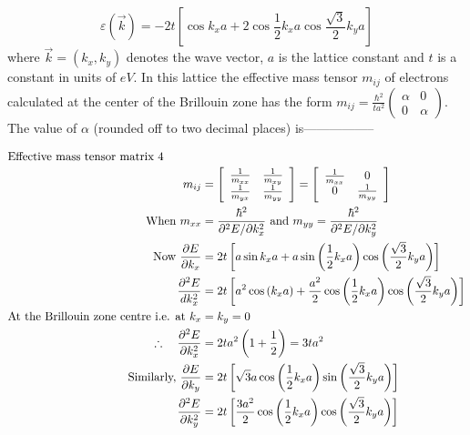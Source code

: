 \begin{enumerate}
	$$
	\varepsilon(\vec{k})=-2 t\left[\cos k_{x} a+2 \cos \frac{1}{2} k_{x} a \cos \frac{\sqrt{3}}{2} k_{y} a\right]
	$$
	where $\vec{k}=\left(k_{x}, k_{y}\right)$ denotes the wave vector, $a$ is the lattice constant and $t$ is a constant in units of $e V .$ In this lattice the effective mass tensor $m_{i j}$ of electrons calculated at the center of the Brillouin zone has the form $m_{i j}=\frac{\hbar^{2}}{t a^{2}}\left(\begin{array}{cc}\alpha & 0 \\ 0 & \alpha\end{array}\right) .$ The value of $\alpha$ (rounded off to two decimal places) is-----------------
{	}
\begin{answer}
\begin{align*}
\intertext{Effective mass tensor matrix 4}
m_{i j}&=\left[\begin{array}{cc}\frac{1}{m_{x x}} & \frac{1}{m_{x y}} \\ \frac{1}{m_{y x}} & \frac{1}{m_{y y}}\end{array}\right]=\left[\begin{array}{cc}\frac{1}{m_{x x}} & 0 \\ 0 & \frac{1}{m_{y y}}\end{array}\right]\\
\text{	When }m_{x x}&=\frac{\hbar^{2}}{\partial^{2} E / \partial k_{x}^{2}}\text{ and }m_{y y}=\frac{\hbar^{2}}{\partial^{2} E / \partial k_{y}^{2}}\\
\text{Now }\frac{\partial E}{\partial k_{x}}&=2 t\left[a \sin k_{x} a+a \sin \left(\frac{1}{2} k_{x} a\right) \cos \left(\frac{\sqrt{3}}{2} k_{y} a\right)\right]\\
\frac{\partial^{2} E}{d k_{x}^{2}}&=2 t\left[a^{2} \cos \left(k_{x} a\right)+\frac{a^{2}}{2} \cos \left(\frac{1}{2} k_{x} a\right) \cos \left(\frac{\sqrt{3}}{2} k_{y} a\right)\right]\\
\text{At the Brillouin zone centre i.e. at }k_{x}&=k_{y}=0\\
\therefore \quad \frac{\partial^{2} E}{\partial k_{x}^{2}}&=2 t a^{2}\left(1+\frac{1}{2}\right)=3 t a^{2}\\
\text{Similarly, }\frac{\partial E}{\partial k_{y}}&=2 t\left[\sqrt{3} a \cos \left(\frac{1}{2} k_{x} a\right) \sin \left(\frac{\sqrt{3}}{2} k_{y} a\right)\right]\\
\frac{\partial^{2} E}{\partial k_{y}^{2}}&=2 t\left[\frac{3 a^{2}}{2} \cos \left(\frac{1}{2} k_{x} a\right) \cos \left(\frac{\sqrt{3}}{2} k_{y} a\right)\right]\\

\end{align*}
\end{answer}
\end{enumerate}
